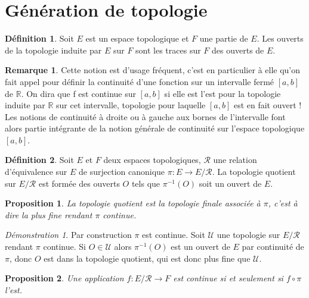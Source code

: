 \documentclass[a4paper, 11pt, french]{book}
\theoremstyle{plain} %
\newtheorem{proposition}{Proposition}
\theoremstyle{definition} %
\newtheorem{definition}{Définition}
\newtheorem{remarque}{Remarque}
\theoremstyle{remark} %
\newtheorem*{demonstration}{Démonstration}
\newcommand{\1}{\mathds{1}}
\newcommand{\inv}[1]{#1^{-1}}
\newcommand{\R}{\mathbb{R}}
\newcommand{\scr}[1]{\mathscr{#1}}
\begin{document}
\section{Génération de topologie}

\begin{definition}
	Soit $E$ est un espace topologique et $F$ une partie de $E$.
	Les ouverts de la topologie induite par $E$ sur $F$ sont les traces sur $F$ des ouverts de $E$.
\end{definition}

\begin{remarque}
	Cette notion est d’usage fréquent, c’est en particulier à elle qu’on fait appel pour définir la continuité d’une fonction sur un intervalle fermé $[a, b]$ de $\R$.
	On dira que f est continue sur $[a, b]$ si elle est l’est pour la topologie induite par $\R$ sur cet intervalle, topologie pour laquelle $[a, b]$ est en fait ouvert !
	Les notions de continuité à droite ou à gauche aux bornes de l’intervalle font alors partie intégrante de la notion générale de continuité sur l’espace topologique $[a, b]$.
\end{remarque}

\begin{definition}
	Soit $E$ et $F$ deux espaces topologiques, $\mathcal{R}$ une relation d’équivalence sur $E$ de surjection canonique $\pi\colon E\rightarrow E/\mathcal{R}$.
	La topologie quotient sur $E/\mathcal{R}$ est formée des ouverts $O$ tels que $\inv{\pi}(O)$ soit un ouvert de $E$.
\end{definition}

\begin{proposition}
	La topologie quotient est la topologie finale associée à $\pi$, c'est à dire la plus fine rendant $\pi$ continue.
\end{proposition}

\begin{demonstration}
	Par construction $\pi$ est continue.
	Soit $\scr{U}$ une topologie sur $E/\mathcal{R}$ rendant $\pi$ continue.
	Si $O\in\scr{U}$ alors $\inv{\pi}(O)$ est un ouvert de $E$ par continuité de $\pi$, donc $O$ est dans la topologie quotient, qui est donc plus fine que $\scr{U}$.
\end{demonstration}

\begin{proposition}
	Une application $f\colon E/\mathcal{R}\rightarrow F$ est continue si et seulement si $f\circ\pi$ l'est.
\end{proposition}
\end{document}
